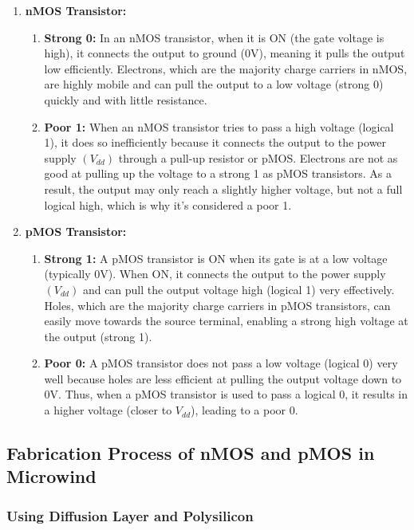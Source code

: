 \documentclass[a4paper,12pt]{article}
\begin{document}
	\begin{enumerate}
		\item \textbf{nMOS Transistor:} 
		\begin{enumerate}
			\item \textbf{Strong 0:}
			In an nMOS transistor, when it is ON (the gate voltage is high), it connects the output to ground (0V), meaning it pulls the output low efficiently. Electrons, which are the majority charge carriers in nMOS, are highly mobile and can pull the output to a low voltage (strong 0) quickly and with little resistance.
			\item \textbf{Poor 1: }
			When an nMOS transistor tries to pass a high voltage (logical 1), it does so inefficiently because it connects the output to the power supply $(V_{dd})$ through a pull-up resistor or pMOS. Electrons are not as good at pulling up the voltage to a strong 1 as pMOS transistors. As a result, the output may only reach a slightly higher voltage, but not a full logical high, which is why it's considered a poor 1.
		\end{enumerate}
		\item \textbf{pMOS Transistor:} 
		\begin{enumerate}
			\item \textbf{Strong 1:}
			A pMOS transistor is ON when its gate is at a low voltage (typically 0V). When ON, it connects the output to the power supply $(V_{dd})$ and can pull the output voltage high (logical 1) very effectively. Holes, which are the majority charge carriers in pMOS transistors, can easily move towards the source terminal, enabling a strong high voltage at the output (strong 1).
			\item \textbf{Poor 0: }
			A pMOS transistor does not pass a low voltage (logical 0) very well because holes are less efficient at pulling the output voltage down to 0V. Thus, when a pMOS transistor is used to pass a logical 0, it results in a higher voltage (closer to $V_{dd}$), leading to a poor 0.
		\end{enumerate}
		
	\end{enumerate}
	
	\subsection{Fabrication Process of nMOS and pMOS in Microwind}
	
	\subsubsection{Using Diffusion Layer and Polysilicon}
	
\end{document}

